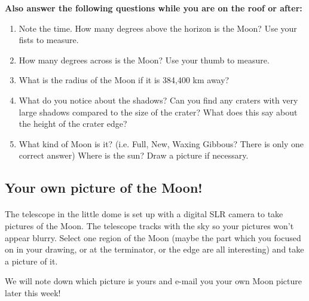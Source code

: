 \documentclass[10pt]{article}
\begin{document}
\begin{flushleft}
\vspace{.05in}
\textbf{Also answer the following questions while you are on the roof or after:}

\begin{enumerate}
    \item Note the time.  How many degrees above the horizon is the Moon?  Use your fists to measure.

    \item How many degrees across is the Moon?  Use your thumb to measure.

    \item What is the radius of the Moon if it is 384,400 km away?


    \item What do you notice about the shadows?  Can you find any craters with very large shadows compared to the size of the crater?  What does this say about the height of the crater edge?

    \item What kind of Moon is it?  (i.e. Full, New, Waxing Gibbous?  There is only one correct answer) Where is the sun?  Draw a picture if necessary.
\end{enumerate}


\vspace{0.2in}
\subsection*{Your own picture of the Moon!}
\vspace{0.2in}
\paragraph{}
The telescope in the little dome is set up with a digital SLR camera to take pictures of the Moon.  The telescope tracks with the sky so your pictures won't appear blurry.  Select one region of the Moon (maybe the part which you focused on in your drawing, or at the terminator, or the edge are all interesting) and take a picture of it.
\vspace{.1in}

We will note down which picture is yours and e-mail you your own Moon picture later this week!
\vspace{.2in}


\end{flushleft}
\end{document}
